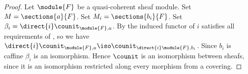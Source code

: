 
\begin{proof}
Let $\module{F}$ be a quasi-coherent sheaf module. 
Set $M = \sections{a}{F}$.
Set $M_i = \sections{b_i}{F}$.
Set $\beta_i = \direct{i}\counit_{\module{F},a}$.
By  the induced functor of $i$ satisfies all requirements of ,
so we have $\direct{i}\counit_{\module{F},a} \iso \counit_{\direct{i}\module{F},b_i}$.
Since $b_i$ is caffine $\beta_i$ is an isomorphism.
Hence $\counit$ is an isomorphism between sheafs, since it is an isomorphism restricted along every morphism from a covering.
\end{proof}